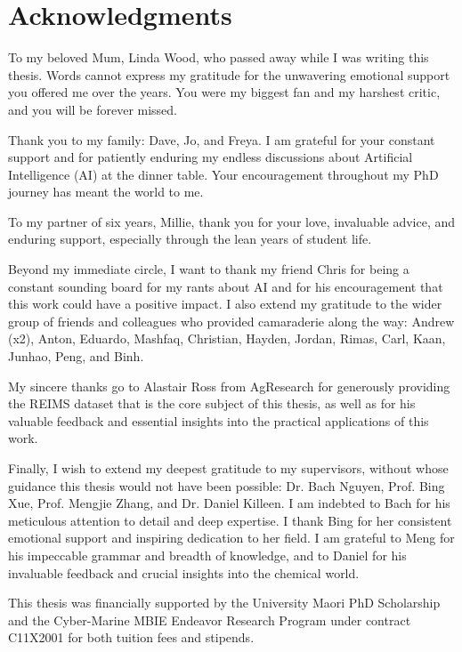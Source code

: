\chapter*{Acknowledgments}

To my beloved Mum, Linda Wood, who passed away while I was writing this thesis. Words cannot express my gratitude for the unwavering emotional support you offered me over the years. You were my biggest fan and my harshest critic, and you will be forever missed.

Thank you to my family: Dave, Jo, and Freya. I am grateful for your constant support and for patiently enduring my endless discussions about Artificial Intelligence (AI) at the dinner table. Your encouragement throughout my PhD journey has meant the world to me.

To my partner of six years, Millie, thank you for your love, invaluable advice, and enduring support, especially through the lean years of student life.

Beyond my immediate circle, I want to thank my friend Chris for being a constant sounding board for my rants about AI and for his encouragement that this work could have a positive impact. I also extend my gratitude to the wider group of friends and colleagues who provided camaraderie along the way: Andrew (x2), Anton, Eduardo, Mashfaq, Christian, Hayden, Jordan, Rimas, Carl, Kaan, Junhao, Peng, and Binh.

My sincere thanks go to Alastair Ross from AgResearch for generously providing the REIMS dataset that is the core subject of this thesis, as well as for his valuable feedback and essential insights into the practical applications of this work.

Finally, I wish to extend my deepest gratitude to my supervisors, without whose guidance this thesis would not have been possible: Dr. Bach Nguyen, Prof. Bing Xue, Prof. Mengjie Zhang, and Dr. Daniel Killeen. I am indebted to Bach for his meticulous attention to detail and deep expertise. I thank Bing for her consistent emotional support and inspiring dedication to her field. I am grateful to Meng for his impeccable grammar and breadth of knowledge, and to Daniel for his invaluable feedback and crucial insights into the chemical world.

This thesis was financially supported by the University Maori PhD Scholarship and the Cyber-Marine MBIE Endeavor Research Program under contract C11X2001 for both tuition fees and stipends.